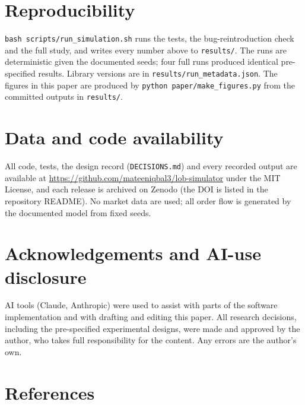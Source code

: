 \documentclass[11pt]{article}
\begin{document}
\hypertarget{reproducibility}{%
\section{Reproducibility}\label{reproducibility}}

\texttt{bash\ scripts/run\_simulation.sh} runs the tests, the bug-reintroduction
check and the full study, and writes every number above to \texttt{results/}.
The runs are deterministic given the documented seeds; four full runs
produced identical pre-specified results. Library versions are in
\texttt{results/run\_metadata.json}. The figures in this paper are produced by
\texttt{python\ paper/make\_figures.py} from the committed outputs in \texttt{results/}.

\hypertarget{data-and-code-availability}{%
\section*{Data and code availability}\label{data-and-code-availability}}

All code, tests, the design record (\texttt{DECISIONS.md}) and every recorded
output are available at \url{https://github.com/mateeniqbal3/lob-simulator}
under the MIT License, and each release is archived on Zenodo (the DOI is
listed in the repository README). No market data are used; all order flow
is generated by the documented model from fixed seeds.

\hypertarget{acknowledgements-and-ai-use-disclosure}{%
\section*{Acknowledgements and AI-use disclosure}\label{acknowledgements-and-ai-use-disclosure}}

AI tools (Claude, Anthropic) were used to assist with parts of the
software implementation and with drafting and editing this paper. All
research decisions, including the pre-specified experimental designs,
were made and approved by the author, who takes full responsibility for
the content. Any errors are the author's own.

\hypertarget{references}{%
\section*{References}\label{references}}
\end{document}
